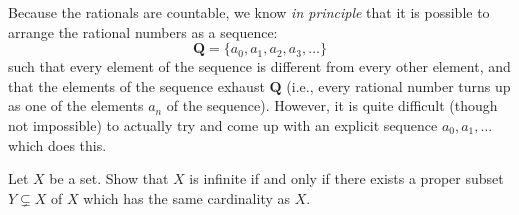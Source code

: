\begin{remark}\label{8.1.16}
    Because the rationals are countable, we know \emph{in principle} that it is possible to arrange the rational numbers as a sequence:
    \[
        \mathbf{Q} = \{a_0, a_1, a_2, a_3, \dots\}
    \]
    such that every element of the sequence is different from every other element, and that the elements of the sequence exhaust \(\mathbf{Q}\)
    (i.e., every rational number turns up as one of the elements \(a_n\) of the sequence).
    However, it is quite difficult (though not impossible) to actually try and come up with an explicit sequence \(a_0, a_1, \dots\) which does this.
\end{remark}

\exercisesection

\begin{exercise}\label{ex 8.1.1}
    Let \(X\) be a set.
    Show that \(X\) is infinite if and only if there exists a proper subset \(Y \subsetneq X\) of \(X\) which has the same cardinality as \(X\).
\end{exercise}

